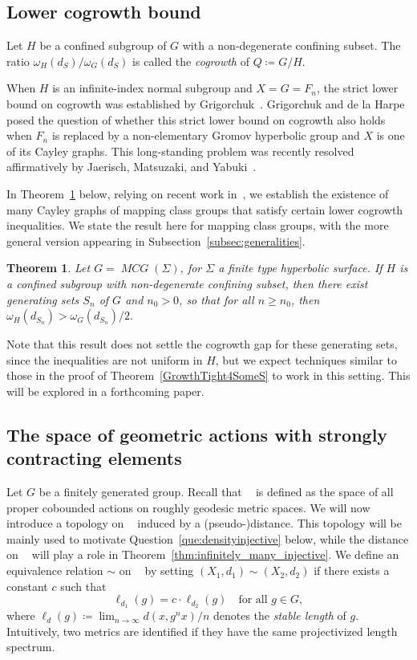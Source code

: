 \documentclass{amsart}
\newtheorem{mainthm}{Theorem}
\numberwithin{thm}{section}
\numberwithin{figure}{section}
\theoremstyle{definition}
\theoremstyle{definition}
\theoremstyle{remark}
\numberwithin{equation}{section}
\DeclareMathOperator{\MCG}{\mathit{MCG}}
\DeclareMathOperator{\DDG}{\mathcal{D}(G)}
\theoremstyle{plain}
\begin{document}
\subsection{Lower cogrowth bound}

Let $H$ be a confined subgroup of $G$ with a non-degenerate confining subset. The ratio $\omega_{H}(d_S)/\omega_{G}(d_S)$ is called the \emph{cogrowth} of $Q \coloneqq G / H$.

When $H$ is an infinite-index normal subgroup and $X = G = F_n$, the strict lower bound on cogrowth was established by Grigorchuk~\cite{Gri77:Symmetric}. Grigorchuk and de la Harpe~\cite[Page~69]{growth_tight} posed the question of whether this strict lower bound on cogrowth also holds when $F_n$ is replaced by a non-elementary Gromov hyperbolic group and $X$ is one of its Cayley graphs. This long-standing problem was recently resolved affirmatively by Jaerisch, Matsuzaki, and Yabuki~\cite{JMY19:Normalizer}.

In Theorem~\ref{thm:cogrowth_mcg} below, relying on recent work in~\cite{CGZ24:Confined}, we establish the existence of many Cayley graphs of mapping class groups that satisfy certain lower cogrowth inequalities. We state the result here for mapping class groups, with the more general version appearing in Subsection~\ref{subsec:generalities}.



\begin{mainthm}\label{thm:cogrowth_mcg}
Let $G=\MCG(\Sigma)$, for $\Sigma$ a finite type hyperbolic surface. If $H$ is a confined subgroup with non-degenerate confining subset,
then there exist generating sets $S_n$ of $G$ and $n_0>0$, so that for all $n \geq n_0$, 
then $\omega_{H}(d_{S_n}) > \omega_{G}(d_{S_n})/2.$
\end{mainthm}

Note that this result does not settle the cogrowth gap for these generating sets, since the inequalities are not uniform in $H$, but we expect techniques similar to those in the proof of Theorem~\ref{GrowthTight4SomeS} to work in this setting. This will be explored in a forthcoming paper.


\subsection{The space of geometric actions with strongly contracting elements}\label{subsec:metric} Let $G$ be a finitely generated group. Recall that $\DDG$ is defined as the space of all proper cobounded actions on roughly geodesic metric spaces. We will now introduce a topology on $\DDG$ induced by a (pseudo-)distance. This topology will be mainly used to motivate Question~\ref{que:densityinjective} below, while the distance on $\DDG$ will play a role in Theorem~\ref{thm:infinitely_many_injective}. We define an equivalence relation $\sim$ on $\DDG$ by setting $(X_1, d_1) \sim (X_2, d_2)$ if there exists a constant $c$ such that 
\[
\ell_{d_1}(g) = c \cdot \ell_{d_2}(g) \quad \text{for all } g \in G,
\]
where $\ell_d(g) \coloneqq \lim_{n \to \infty} d(x, g^n x)/n$ denotes the \emph{stable length} of $g$. Intuitively, two metrics are identified if they have the same projectivized length spectrum.
\end{document}
